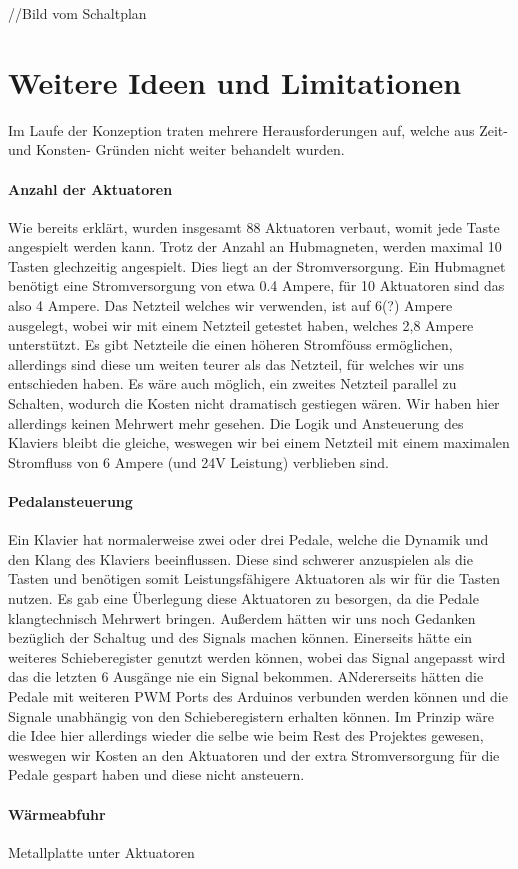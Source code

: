 //Bild vom Schaltplan


\section{Weitere Ideen und Limitationen}

Im Laufe der Konzeption traten mehrere Herausforderungen auf, welche aus Zeit- und Konsten- Gründen nicht weiter
behandelt wurden.
\paragraph{Anzahl der Aktuatoren}
Wie bereits erklärt, wurden insgesamt 88 Aktuatoren verbaut, womit jede Taste angespielt werden kann. Trotz der Anzahl an
Hubmagneten, werden maximal 10 Tasten glechzeitig angespielt. Dies liegt an der Stromversorgung. Ein Hubmagnet benötigt
eine Stromversorgung von etwa 0.4 Ampere, für 10 Aktuatoren sind das also 4 Ampere. Das Netzteil welches wir verwenden, ist auf
6(?) Ampere ausgelegt, wobei wir mit einem Netzteil getestet haben, welches 2,8 Ampere unterstützt. Es gibt Netzteile die
einen höheren Stromföuss ermöglichen, allerdings sind diese um weiten teurer als das Netzteil, für welches wir uns entschieden haben.
Es wäre auch möglich, ein zweites Netzteil parallel zu Schalten, wodurch die Kosten nicht dramatisch gestiegen wären.
Wir haben hier allerdings keinen Mehrwert mehr gesehen. Die Logik und Ansteuerung des Klaviers bleibt die gleiche, weswegen
wir bei einem Netzteil mit einem maximalen Stromfluss von 6 Ampere (und 24V Leistung) verblieben sind.

\paragraph{Pedalansteuerung}
Ein Klavier hat normalerweise zwei oder drei Pedale, welche die Dynamik und den Klang des Klaviers beeinflussen.
Diese sind schwerer anzuspielen als die Tasten und benötigen somit Leistungsfähigere Aktuatoren als wir für die Tasten nutzen.
Es gab eine Überlegung diese Aktuatoren zu besorgen, da die Pedale klangtechnisch Mehrwert bringen.
Außerdem hätten wir uns noch Gedanken bezüglich der Schaltug und des Signals machen können.
Einerseits hätte ein weiteres Schieberegister genutzt werden können, wobei das Signal angepasst wird das die letzten 6 Ausgänge nie ein Signal bekommen.
ANdererseits hätten die Pedale mit weiteren PWM Ports des Arduinos verbunden werden können und die Signale unabhängig von den
Schieberegistern erhalten können.
Im Prinzip wäre die Idee hier allerdings wieder die selbe wie beim Rest des Projektes gewesen,
weswegen wir Kosten an den Aktuatoren und der extra Stromversorgung für die Pedale gespart haben und diese nicht ansteuern.

\paragraph{Wärmeabfuhr}
Metallplatte unter Aktuatoren